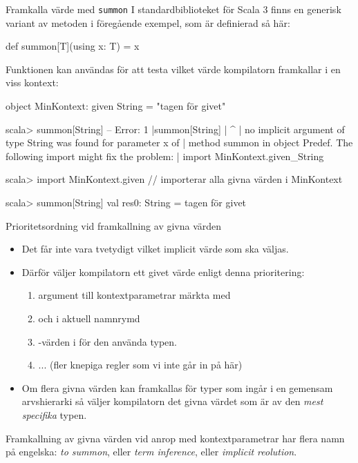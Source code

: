 \begin{Slide}{Framkalla värde med \texttt{summon}}\SlideFontSmall
I standardbiblioteket för Scala 3 finns en generisk variant av metoden  i föregående exempel, som är definierad så här:
\begin{Code}
def summon[T](using x: T) = x 
\end{Code}
Funktionen  kan användas för att testa vilket värde kompilatorn framkallar i en viss kontext:
\begin{Code}
object MinKontext:
  given String = "tagen för givet"
\end{Code}
\vspace{-0.9em}
\begin{REPLsmall}
scala> summon[String]
-- Error:
1 |summon[String]
  |              ^
  | no implicit argument of type String was found for parameter x of 
  | method summon in object Predef. The following import might fix the problem:
  | import MinKontext.given_String

scala> import MinKontext.given    // importerar alla givna värden i MinKontext

scala> summon[String]
val res0: String = tagen för givet
\end{REPLsmall}
\end{Slide}

\begin{Slide}{Prioritetsordning vid framkallning av givna värden}\SlideFontSmall
\begin{itemize}\SlideFontSmall
\item Det får inte vara tvetydigt vilket implicit värde som ska väljas.
\item Därför väljer kompilatorn ett givet värde enligt denna prioritering:
\begin{enumerate}\SlideFontTiny
\item {} argument till kontextparametrar märkta med 
\item {} och  i aktuell namnrymd  
\item {}-värden i  för den använda typen.
\item ... (fler knepiga regler som vi inte går in på här)
\end{enumerate}
\item Om flera givna värden kan framkallas för typer som ingår i en gemensam arvshierarki så väljer kompilatorn det givna värdet som är av den \emph{mest specifika} typen.
\end{itemize}
Framkallning av givna värden vid anrop med kontextparametrar har flera namn på engelska: \emph{to summon}, eller \emph{term inference}, eller \emph{implicit reolution}. 
\end{Slide}

